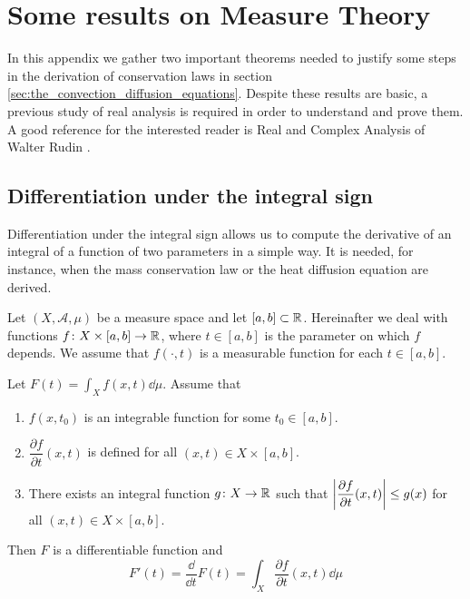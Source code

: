 
\section{Some results on Measure Theory}

In this appendix we gather two important theorems needed to justify some steps
in the derivation of conservation laws in section
\ref{sec:the_convection_diffusion_equations}. Despite these results are basic, a
previous study of real analysis is required in order to understand and prove
them. A good reference for the interested reader is Real and Complex Analysis of
Walter Rudin \cite{rudin1987real}. 

\subsection{Differentiation under the integral sign}

Differentiation under the integral sign allows us to compute the derivative of
an integral of a function of two parameters in a simple way. It is needed, for
instance, when the mass conservation law or the heat diffusion equation are
derived. 

Let $(X, \mathcal{A}, \mu)$ be a measure space and let $[a, b] \subset \mathbb{R}$.
Hereinafter we deal with functions $f \colon X \times [a,b] \rightarrow \mathbb{R}$,
where $t \in [a, b]$ is the parameter on which $f$ depends. We assume that
$f(\cdot, t)$ is a measurable function for each $t \in [a, b]$.

\begin{theorem}
	\label{theo:differentiation_under_the_integral_sign} Let $F(t) = \int_X
	f(x,t) \dd{\mu}$. Assume that
	\begin{enumerate}[label={(\roman*)}, topsep=0pt]
		\item $f(x,t_0)$ is an integrable function for some $t_0 \in
		[a,b]$.
		\item $\dfrac{\partial f}{\partial t}(x,t)$ is defined for all
		$(x, t) \in X \times [a, b]$.
		\item There exists an integral function $g \colon X \rightarrow \mathbb{R}$
		such that $\abs{\dfrac{\partial f}{\partial t} (x,t)} \leq
		g(x)$ for all $(x, t) \in X \times [a, b]$.
	\end{enumerate}
	Then $F$ is a differentiable function and
	\[
		F'(t) = \frac{\dd}{\dd t} F(t) = \int_X \frac{\partial f}{\partial t}(x,t) \dd{\mu}
	\]
\end{theorem}

